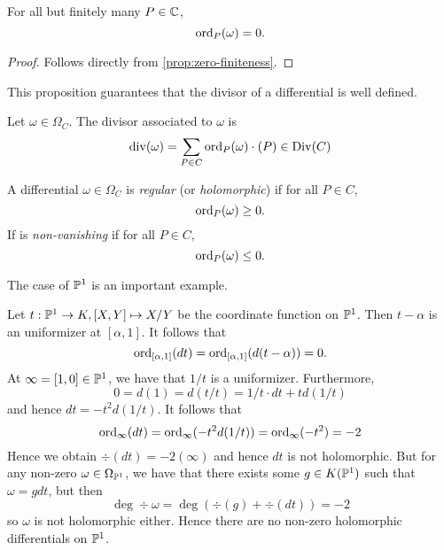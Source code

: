 \begin{proposition}
	For all but finitely many $P \in \mathbb{C}$, 
	\begin{equation*}
		\operatorname{ord}_P(\omega) = 0.
	\end{equation*}
\end{proposition}

\begin{proof}
	Follows directly from \ref{prop:zero-finiteness}.
\end{proof}

This proposition guarantees that the divisor of a differential is
well defined.
\begin{definition}
	Let $\omega \in \Omega_C$. The divisor associated to $\omega$ is
	\begin{equation*}
		\operatorname{div}(\omega) = \sum_{P \in C} \operatorname{ord}_P(\omega)\cdot (P) \in \operatorname{Div}(C)
	\end{equation*}
\end{definition}


\begin{definition}
	A differential $\omega \in \Omega_C$ is \emph{regular} 
	(or \emph{holomorphic})
	if for all $P \in C$,
	\begin{equation*}
		\operatorname{ord}_P(\omega) \geq 0.
	\end{equation*}
	If is \emph{non-vanishing} if for all $P \in C$,
	\begin{equation*}
		\operatorname{ord}_P(\omega) \leq 0.
	\end{equation*}
\end{definition}

The case of $\mathbb{P}^1$ is an important example.
\begin{example}
	\label{ex:proj-holomorphic}
	Let $t:\mathbb{P}^1 \to K, [X, Y]\mapsto X/Y$ be the coordinate function on
	$\mathbb{P}^1$. Then $t - \alpha$ is an uniformizer at $[\alpha, 1]$.
	It follows that
	\begin{equation*}
		\operatorname{ord}_{[\alpha, 1]}(dt) = \operatorname{ord}_{[\alpha, 1]}(d(t - \alpha)) = 0.
	\end{equation*}
	At $\infty = [1, 0]\in \mathbb{P}^1$, we have that $1/t$ is a uniformizer.
	Furthermore,
	\begin{equation*}
		0 = d(1) = d(t/t) = 1/t\cdot dt + td(1/t)
	\end{equation*}
	and hence $dt = -t^2d(1/t)$. It follows that 
	\begin{equation*}
		\operatorname{ord}_{\infty}(dt) = \operatorname{ord}_{\infty}(-t^2d(1/t)) = 
		\operatorname{ord}_{\infty}(-t^2) = -2
	\end{equation*}
	Hence we obtain $\div(dt) = -2(\infty)$ and hence $dt$ is not holomorphic.
	But for any non-zero $\omega \in \Omega_{\mathbb{P}^1}$, 
	we have that there exists some $g \in K(\mathbb{P}^1)$ such that 
	$\omega = gdt$, but then
	\begin{equation*}
		\deg\div \omega = \deg(\div(g) + \div(dt)) = -2
	\end{equation*}
	so $\omega$ is not holomorphic either.
	Hence there are no non-zero holomorphic differentials on $\mathbb{P}^1$.
\end{example}

